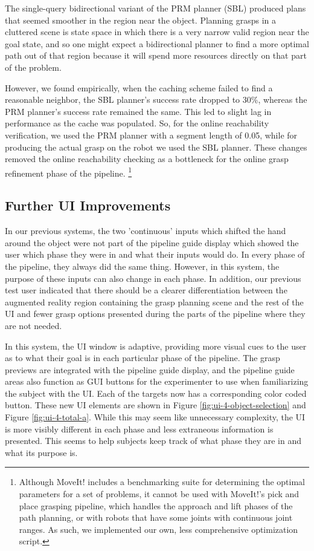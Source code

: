 The single-query bidirectional variant of the PRM planner (SBL) produced plans that seemed smoother in the region near the object. Planning grasps in a cluttered scene is state space in which there is a very narrow valid region near the goal state, and so one might expect a bidirectional planner to find a more optimal path out of that region because it will spend more resources directly on that part of the problem. 

However, we found empirically, when the caching scheme failed to find a reasonable neighbor, the SBL planner's success rate dropped to 30\%, whereas the PRM planner's success rate remained the same. This led to slight lag in performance as the cache was populated. So, for the online reachability verification, we used the PRM planner with a segment length of 0.05, while for producing the actual grasp on the robot we used the SBL planner. These changes removed the online reachability checking as a bottleneck for the online grasp refinement phase of the pipeline. \footnote{Although MoveIt! includes a benchmarking suite for determining the optimal parameters for a set of problems, it cannot be used with MoveIt!'s pick and place grasping pipeline, which handles the approach and lift phases of the path planning, or with robots that have some joints with continuous joint ranges. As such, we implemented our own, less comprehensive optimization script.}

\subsection{Further UI Improvements}
In our previous systems, the two 'continuous' inputs which shifted the hand around the object were not part of the pipeline guide display which showed the user which phase they were in and what their inputs would do. In every phase of the pipeline, they always did the same thing. However, in this system, the purpose of these inputs can also change in each phase. In addition, our previous test user indicated that there should be a clearer differentiation between the augmented reality region containing the grasp planning scene and the rest of the UI and fewer grasp options presented during the parts of the pipeline where they are not needed.

In this system, the UI window is adaptive, providing more visual cues to the user as to what their goal is in each particular phase of the pipeline. The grasp previews are integrated with the pipeline guide display, and the pipeline guide areas also function as GUI buttons for the experimenter to use when familiarizing the subject with the UI. Each of the targets now has a corresponding color coded button. These new UI elements are shown in Figure \ref{fig:ui-4-object-selection} and Figure \ref{fig:ui-4-total-a}. While this may seem like unnecessary complexity, the UI is more visibly different in each phase and less extraneous information is presented. This seems to help subjects keep track of what phase they are in and what its purpose is. 

